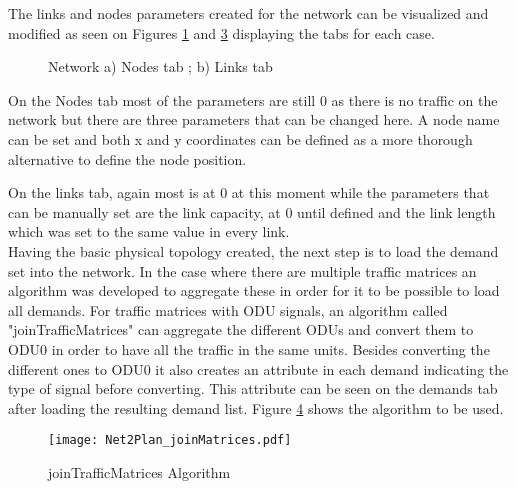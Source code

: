 	The links and nodes parameters created for the network can be visualized and modified as seen on Figures \ref{Net2Plan_Network_Parameters_a} and \ref{Net2Plan_Network_Parameters_b} displaying the tabs for each case.
	

	\begin{figure}[!h]
		\centering
		\begin{subfigure}[b]
			\texttt{[image: Net2Plan\_Network\_Parameters.pdf]}
			\label{Net2Plan_Network_Parameters_a}
		\end{subfigure}

		\begin{subfigure}[b]
			\texttt{[image: Net2Plan\_Network\_Parameters\_1.pdf]}
			\label{Net2Plan_Network_Parameters_b}
		\end{subfigure}
		\caption{Network a) Nodes tab ; b) Links tab}
	\end{figure}	
	
	On the Nodes tab most of the parameters are still 0 as there is no traffic on the network but there are three parameters that can be changed here. A node name can be set and both x and y coordinates can be defined as a more thorough alternative to define the node position.
	
	On the links tab, again most is at 0 at this moment while the parameters that can be manually set are the link capacity, at 0 until defined and the link length which was set to the same value in every link.\\
	
	Having the basic physical topology created, the next step is to load the demand set into the network. In the case where there are multiple traffic matrices an algorithm was developed to aggregate these in order for it to be possible to load all demands.
	For traffic matrices with ODU signals, an algorithm called "joinTrafficMatrices" can aggregate the different ODUs and convert them to ODU0 in order to have all the traffic in the same units. Besides converting the different ones to ODU0 it also creates an attribute in each demand indicating the type of signal before converting. This attribute can be seen on the demands tab after loading the resulting demand list. Figure \ref{joinMatrices} shows the algorithm to be used.
	

	\begin{figure}[h!]
		\centering
		\texttt{[image: Net2Plan\_joinMatrices.pdf]}
		\caption{joinTrafficMatrices Algorithm}
		\label{joinMatrices}		
	\end{figure}
	
